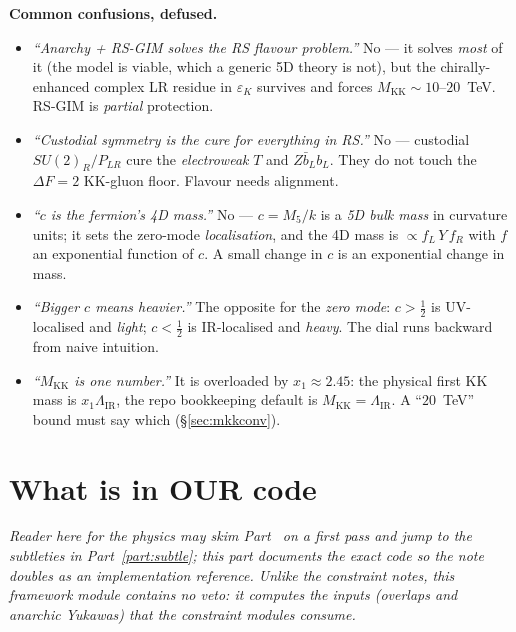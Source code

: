 \documentclass[11pt]{article}
\newenvironment{callout}[1]{%
  \par\medskip\begin{shaded}\noindent\textbf{#1}\par\smallskip}{\end{shaded}\medskip}
\newcommand{\MKK}{M_{\mathrm{KK}}}
\newcommand{\LIR}{\Lambda_{\mathrm{IR}}}
\newcommand{\half}{\tfrac{1}{2}}
\newcommand{\epsK}{\varepsilon_K}
\theoremstyle{definition}
\begin{document}
\begin{callout}{Common confusions, defused.}
\begin{itemize}[leftmargin=1.2em,nosep]
\item[\textbf{A.}] \emph{``Anarchy + RS-GIM solves the RS flavour problem.''} No
--- it solves \emph{most} of it (the model is viable, which a generic 5D theory is
not), but the chirally-enhanced complex LR residue in $\epsK$ survives and forces
$\MKK\sim10$--$20$~TeV. RS-GIM is \emph{partial} protection.
\item[\textbf{B.}] \emph{``Custodial symmetry is the cure for everything in RS.''}
No --- custodial $SU(2)_R/P_{LR}$ cure the \emph{electroweak} $T$ and $Z\bar b_Lb_L$.
They do not touch the $\Delta F=2$ KK-gluon floor. Flavour needs alignment.
\item[\textbf{C.}] \emph{``$c$ is the fermion's 4D mass.''} No --- $c=M_5/k$ is a
\emph{5D bulk mass} in curvature units; it sets the zero-mode \emph{localisation},
and the 4D mass is $\propto f_L\,Y\,f_R$ with $f$ an exponential function of $c$.
A small change in $c$ is an exponential change in mass.
\item[\textbf{D.}] \emph{``Bigger $c$ means heavier.''} The opposite for the
\emph{zero mode}: $c>\half$ is UV-localised and \emph{light}; $c<\half$ is
IR-localised and \emph{heavy}. The dial runs backward from naive intuition.
\item[\textbf{E.}] \emph{``$\MKK$ is one number.''} It is overloaded by
$x_1\approx2.45$: the physical first KK mass is $x_1\LIR$, the repo bookkeeping
default is $\MKK=\LIR$. A ``$20$~TeV'' bound must say which (\S\ref{sec:mkkconv}).
\end{itemize}
\end{callout}

\part{What is in OUR code}
\label{part:code}

\emph{Reader here for the physics may skim Part~\ref{part:code} on a first pass
and jump to the subtleties in Part~\ref{part:subtle}; this part documents the
exact code so the note doubles as an implementation reference. Unlike the
constraint notes, this framework module contains no veto: it computes the
\emph{inputs} (overlaps and anarchic Yukawas) that the constraint modules
consume.}
\end{document}
